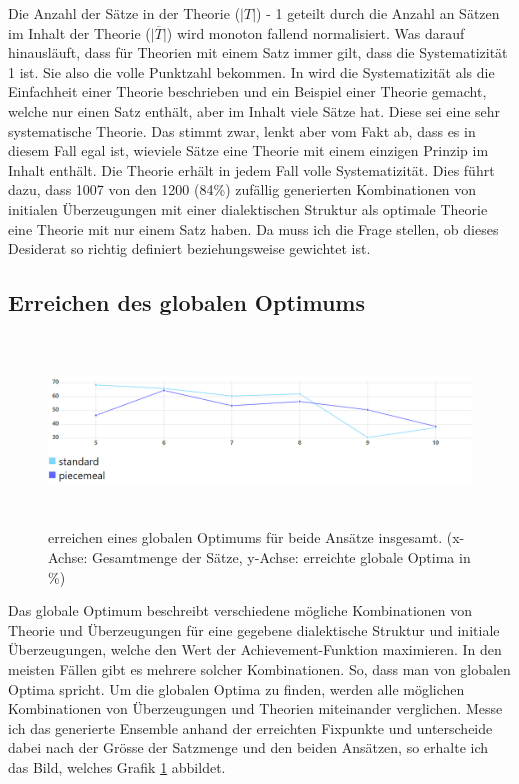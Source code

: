\documentclass{article}
\begin{document}
Die Anzahl der Sätze in der Theorie ($\lvert T \rvert$) - 1 geteilt durch die Anzahl an Sätzen im Inhalt der Theorie ($\lvert \overline{T} \rvert$) wird monoton fallend normalisiert. Was darauf hinausläuft, dass für Theorien mit einem Satz immer gilt, dass die Systematizität 1 ist. Sie also die volle Punktzahl bekommen. In \autocite[S.~447]{beisbart_making_2021} wird die Systematizität als die Einfachheit einer Theorie beschrieben und ein Beispiel einer Theorie gemacht, welche nur einen Satz enthält, aber im Inhalt viele Sätze hat. Diese sei eine sehr systematische Theorie. Das stimmt zwar, lenkt aber vom Fakt ab, dass es in diesem Fall egal ist, wieviele Sätze eine Theorie mit einem einzigen Prinzip im Inhalt enthält. Die Theorie erhält in jedem Fall volle Systematizität. Dies führt dazu, dass 1007 von den 1200 (84\%) zufällig generierten Kombinationen von initialen Überzeugungen mit einer dialektischen Struktur als optimale Theorie eine Theorie mit nur einem Satz haben. Da muss ich die Frage stellen, ob dieses Desiderat so richtig definiert beziehungsweise gewichtet ist.

\subsection{Erreichen des globalen Optimums}

\begin{figure}[ht]
  \centering
  \includegraphics[width=\textwidth,height=5cm,keepaspectratio]{images/global_optima_standard_piecemeal.png}
  \caption{erreichen eines globalen Optimums für beide Ansätze insgesamt. (x-Achse: Gesamtmenge der Sätze, y-Achse: erreichte globale Optima in \%) \label{fig:GlobOptPoolsizeLine}}
\end{figure}

Das globale Optimum beschreibt verschiedene mögliche Kombinationen von Theorie und Überzeugungen für eine gegebene dialektische Struktur und initiale Überzeugungen, welche den Wert der Achievement-Funktion maximieren. In den meisten Fällen gibt es mehrere solcher Kombinationen. So, dass man von globalen Optima spricht. Um die globalen Optima zu finden, werden alle möglichen Kombinationen von Überzeugungen und Theorien miteinander verglichen. Messe ich das generierte Ensemble anhand der erreichten Fixpunkte und unterscheide dabei nach der Grösse der Satzmenge und den beiden Ansätzen, so erhalte ich das Bild, welches Grafik \ref{fig:GlobOptPoolsizeLine} abbildet.
\end{document}
